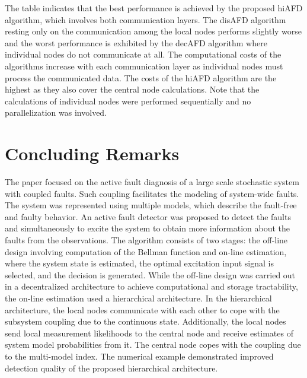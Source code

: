 \documentclass[conference,letterpaper]{IEEEtran}
\begin{document}
The table indicates that the best performance is achieved by the proposed hiAFD algorithm, which involves both communication layers.
The disAFD algorithm resting only on the communication among the local nodes performs slightly worse and the worst performance is exhibited by the decAFD algorithm where individual nodes do not communicate at all. 
The computational costs of the algorithms increase with each communication layer as individual nodes must process the communicated data.
The costs of the hiAFD algorithm are the highest as they also cover the central node calculations.
Note that the calculations of individual nodes were performed sequentially and no parallelization was involved. 
\section{Concluding Remarks}\label{sec:conclusion}
The paper focused on the active fault diagnosis of a large scale stochastic system with coupled faults.
Such coupling facilitates the modeling of system-wide faults.
The system was represented using multiple models, which describe the fault-free and faulty behavior.
An active fault detector was proposed to detect the faults and simultaneously to excite the system to obtain more information about the faults from the observations. 
The algorithm consists of two stages: the off-line design involving computation of the Bellman function and on-line estimation, where the system state is estimated, the optimal excitation input signal is selected, and the decision is generated.
While the off-line design was carried out in a decentralized architecture to achieve computational and storage tractability, the on-line estimation used a hierarchical architecture.
In the hierarchical architecture, the local nodes communicate with each other to cope with the subsystem coupling due to the continuous state.
Additionally, the local nodes send local measurement likelihoods to the central node and receive estimates of system model probabilities from it.
The central node copes with the coupling due to the multi-model index.
The numerical example demonstrated improved detection quality of the proposed hierarchical architecture.
\addtolength{\textheight}{-13cm}


\end{document}
